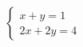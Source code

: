 \documentclass[preview]{standalone}
\begin{document}
\begin{align*}
\left\{ \begin{array}{cl} x + y = 1 \\[1pt] 2x + 2y = 4 \end{array} \right.
\end{align*}
\end{document}
